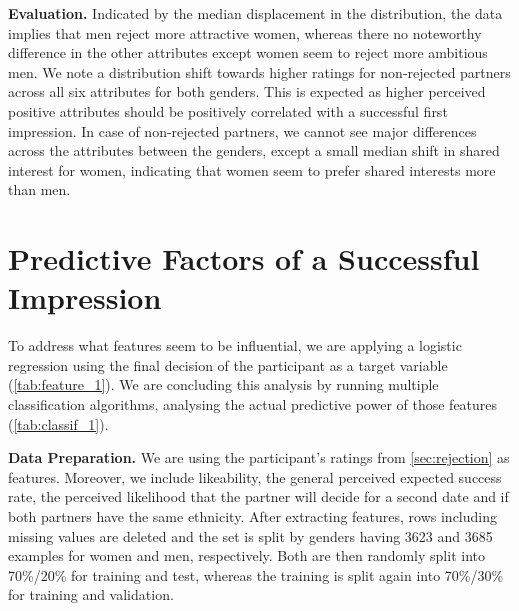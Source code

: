 \documentclass{article}
\begin{document}
\textbf{Evaluation.} Indicated by the median displacement in the distribution, the data implies that men reject more attractive women, whereas there no noteworthy difference in the other attributes except women seem to reject more ambitious men. 
We note a distribution shift towards higher ratings for non-rejected partners across all six attributes for both genders. This is expected as higher perceived positive attributes should be positively correlated with a successful first impression.
In case of non-rejected partners, we cannot see major differences across the attributes between the genders, except a small median shift in shared interest for women, indicating that women seem to prefer shared interests more than men. 

 
\section{Predictive Factors of a Successful Impression} \label{sec:factors_impress}

To address what features seem to be influential, we are applying a logistic regression using the final decision of the participant as a target variable (\autoref{tab:feature_1}). 
We are concluding this analysis by running multiple classification algorithms, analysing the actual predictive power of those features (\autoref{tab:classif_1}).  

\textbf{Data Preparation.} We are using the participant's ratings from \autoref{sec:rejection} as features. 
Moreover, we include likeability, the general perceived expected success rate, the perceived likelihood that the partner will decide for a second date and if both partners have the same ethnicity. 
After extracting features, rows including missing values are deleted and the set is split by genders having 3623 and 3685 examples for women and men, respectively. Both are then randomly split into 70\%/20\% for training and test, whereas the training is split again into 70\%/30\% for training and validation.
\end{document}
